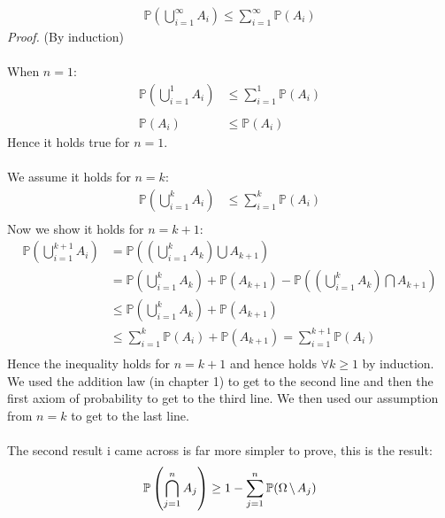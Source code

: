 \documentclass[,oneside]{article}
\begin{document}
\begin{enumerate}
\begin{align*}
\mathbb{P} \left ( \bigcup_{i=1}^{\infty} A_i \right ) \leq \sum_{i=1}^{\infty} \mathbb{P}(A_i)
\end{align*}
\textit{Proof.} (By induction)\\ \\
When $n = 1:$
\begin{align*}
\mathbb{P} \left ( \bigcup_{i=1}^{1} A_i \right ) &\leq \sum_{i=1}^{1} \mathbb{P}(A_i)\\ \\
\mathbb{P}(A_i) & \leq \mathbb{P}(A_i)
\end{align*}
Hence it holds true for $n=1$.\\ \\
We assume it holds for $n=k:$
\begin{align*}
\mathbb{P} \left ( \bigcup_{i=1}^{k} A_i \right ) &\leq \sum_{i=1}^{k} \mathbb{P}(A_i)\\
\end{align*}
Now we show it holds for $n=k+1:$\\
\begin{align*}
\mathbb{P} \left ( \bigcup_{i=1}^{k+1} A_i \right ) &= \mathbb{P} \left ( \left ( \bigcup_{i=1}^{k} A_k \right ) \bigcup A_{k+1} \right )\\
 &= \mathbb{P} \left ( \bigcup_{i=1}^{k} A_k \right ) + \mathbb{P}(A_{k+1}) -  \mathbb{P} \left ( \left ( \bigcup_{i=1}^{k} A_k \right ) \bigcap A_{k+1} \right )\\
 &\leq  \mathbb{P} \left ( \bigcup_{i=1}^{k} A_k \right ) + \mathbb{P}(A_{k+1}) \\
 &\leq \sum_{i=1}^{k} \mathbb{P}(A_i) + \mathbb{P}(A_{k+1}) = \sum_{i=1}^{k+1} \mathbb{P}(A_i)\\
\end{align*}
Hence the inequality holds for $n=k+1$ and hence holds $\forall k \geq 1$ by induction. We used the addition law (in chapter 1) to get to the second line and then the first axiom of probability to get to the third line. We then used our assumption from $n=k$ to get to the last line.\\ \\
The second result i came across is far more simpler to prove, this is the result:
\begin{align*}
\mathbb{P} \left ( \bigcap_{j=1}^{n} A_j \right ) \geq 1-\sum_{j=1}^{n} \mathbb{P}( \Omega \hspace{0.05cm} \backslash \hspace{0.05cm} A_j )
\end{align*}

\end{enumerate}
\end{document}
